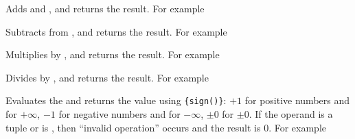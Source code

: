\documentclass[oneside]{book}
\begin{document}
\begin{function}{\FpMathAdd}
\begin{syntax}
  
\end{syntax}
Adds  and ,
and returns the result. For example
\begin{demohigh}
\end{demohigh}
\end{function}

\begin{function}{\FpMathSub}
\begin{syntax}
  
\end{syntax}
Subtracts  from ,
and returns the result. For example
\begin{demohigh}
\end{demohigh}
\end{function}

\begin{function}{\FpMathMult}
\begin{syntax}
  
\end{syntax}
Multiplies  by ,
and returns the result. For example
\begin{demohigh}
\end{demohigh}
\end{function}

\begin{function}{\FpMathDiv}
\begin{syntax}
  
\end{syntax}
Divides  by ,
and returns the result. For example
\begin{demohigh}
\end{demohigh}
\end{function}

\begin{function}{\FpMathSign}
\begin{syntax}
 
\end{syntax}
Evaluates the  and returns the value
using \verb|{sign(|\verb|)}|: $+1$ for positive
numbers and for $+\infty$, $-1$ for negative numbers and for
$-\infty$, $\pm 0$ for $\pm 0$.  If the operand is a tuple or is
\nan{}, then \enquote{invalid operation} occurs and the result
is $0$. For example
\begin{demohigh}
\end{demohigh}
\end{function}
\end{document}
